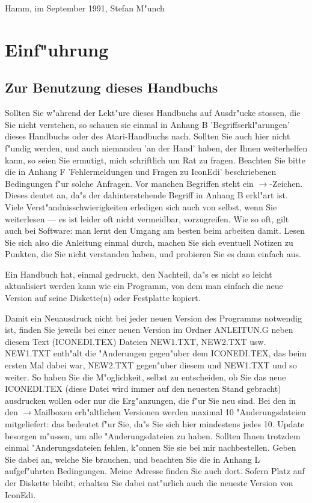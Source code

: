 Hamm, im September 1991, Stefan M"unch

\newpage

\setcounter{page}{1}
\tableofcontents
\newpage
{}
\setcounter{page}{1}

%
\chapter{Einf"uhrung} 
\section{Zur Benutzung dieses Handbuchs} 
Sollten Sie w"ahrend der Lekt"ure dieses Handbuchs auf Ausdr"ucke 
stossen, die Sie nicht verstehen, so schauen sie einmal in 
Anhang B 'Begriffserkl"arungen' dieses Handbuchs oder des 
Atari-Handbuchs nach. Sollten Sie auch hier nicht f"undig werden, 
und auch niemanden 'an der Hand' haben, der Ihnen weiterhelfen 
kann, so seien Sie ermutigt, mich schriftlich um Rat zu fragen. 
Beachten Sie bitte die in Anhang F 'Fehlermeldungen und Fragen 
zu IconEdi' beschriebenen Bedingungen f"ur solche Anfragen.
Vor manchen Begriffen steht ein $\to$-Zeichen. Dieses deutet an,
da"s der dahinterstehende Begriff in Anhang B erkl"art ist.
Viele Verst"andnisschwierigkeiten erledigen sich auch von
selbst, wenn Sie weiterlesen --- es ist leider oft nicht 
vermeidbar, vorzugreifen. Wie so oft, gilt auch bei Software:
man lernt den Umgang am besten beim arbeiten damit. Lesen Sie
sich also die Anleitung einmal durch, machen Sie sich eventuell
Notizen zu Punkten, die Sie nicht verstanden haben, und probieren
Sie es dann einfach aus.

 
Ein Handbuch hat, einmal gedruckt, den Nachteil, da"s es 
nicht so leicht aktualisiert werden kann wie ein Programm,
von dem man einfach die neue Version auf seine Diskette(n) oder
Festplatte kopiert. 

Damit ein Neuausdruck nicht bei jeder neuen Version des 
Programms notwendig ist, finden Sie jeweils bei einer neuen 
Version im Ordner ANLEITUN.G neben diesem Text (ICONEDI.TEX)
Dateien NEW1.TXT, NEW2.TXT usw. NEW1.TXT enth"alt die 
"Anderungen gegen"uber dem ICONEDI.TEX, das beim ersten Mal
dabei war, NEW2.TXT gegen"uber diesem und NEW1.TXT und so 
weiter. So haben Sie die M"oglichkeit, selbst zu entscheiden,
ob Sie das neue ICONEDI.TEX (diese Datei wird immer auf den 
neuesten Stand gebracht) ausdrucken wollen oder nur die 
Erg"anzungen, die f"ur Sie neu sind. Bei den in den 
$\to$Mailboxen erh"altlichen Versionen werden maximal 10
"Anderungsdateien mitgeliefert: das bedeutet f"ur Sie, da"s 
Sie sich hier mindestens jedes 10. Update besorgen m"ussen,
um alle "Anderungsdateien zu haben. Sollten Ihnen trotzdem
einmal "Anderungsdateien fehlen, k"onnen Sie sie bei mir
nachbestellen. Geben Sie dabei an, welche Sie brauchen,
und beachten Sie die in Anhang L aufgef"uhrten Bedingungen.
Meine Adresse finden Sie auch dort. Sofern Platz auf
der Diskette bleibt, erhalten Sie dabei nat"urlich auch
die neueste Version von IconEdi.

